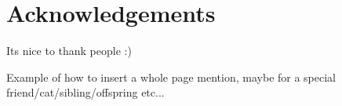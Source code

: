 

\section*{Acknowledgements}

Its nice to thank people :)


\newpage

\vspace*{\fill}

\begin{center}
Example of how to insert a whole page mention, maybe for a special friend/cat/sibling/offspring etc...

\vspace*{\fill}\end{center}



\newpage

 
